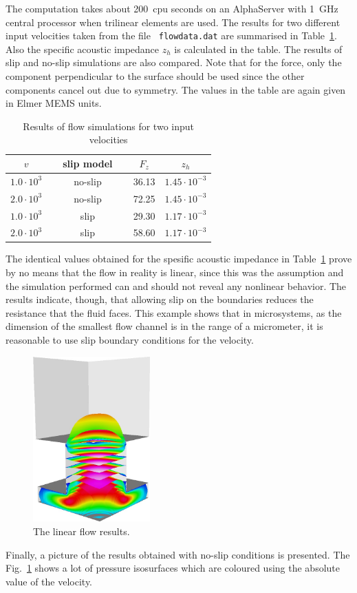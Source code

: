 The computation takes about 200~cpu seconds on an AlphaServer with
1~GHz central processor when trilinear elements are used. The results
for two different input velocities taken from the file {\mbox{\tt
flowdata.dat}} are summarised in Table~\ref{tab:imped_res}. Also the
specific acoustic impedance $z_h$ is calculated in the table. The
results of slip and no-slip simulations are also compared.  Note that
for the force, only the component perpendicular to the surface should
be used since the other components cancel out due to symmetry. The
values in the table are again given in Elmer MEMS units.
\begin{table}[htb]
\caption{Results of flow simulations for two input velocities}
\label{tab:imped_res}
\begin{center}
\begin{tabular}{cccc} \hline
$v$ & \ \ slip model\ \  & $F_z$ & $z_h$ \\ \hline 
$1.0\cdot 10^3$   & no-slip  & 36.13  &  $1.45\cdot10^{-3}$ \\
$2.0\cdot 10^3$   & no-slip  & 72.25  &  $1.45\cdot10^{-3}$ \\ \hline
$1.0\cdot 10^3$   & slip     & 29.30  &  $1.17\cdot10^{-3}$ \\
$2.0\cdot 10^3$   & slip     & 58.60  &  $1.17\cdot10^{-3}$ \\ \hline
\end{tabular}
\end{center}
\end{table}

The identical values obtained for the spesific acoustic impedance in
Table~\ref{tab:imped_res} prove by no means that the flow in reality
is linear, since this was the assumption and the simulation performed
can and should not reveal any nonlinear behavior. The results
indicate, though, that allowing slip on the boundaries reduces the
resistance that the fluid faces. This example shows that in
microsystems, as the dimension of the smallest flow channel is in the
range of a micrometer, it is reasonable to use slip boundary
conditions for the velocity.

\begin{figure}[htb]
  \centerline{\includegraphics[width=0.40\textwidth]{flow_res}}
  \caption{The linear flow results.} 
  \label{fig:flow_res}
\end{figure}
Finally, a picture of the results obtained with no-slip conditions is
presented. The Fig.~\ref{fig:flow_res} shows a lot of pressure
isosurfaces which are coloured using the absolute value of the
velocity.


\vfill
\mbox{}
